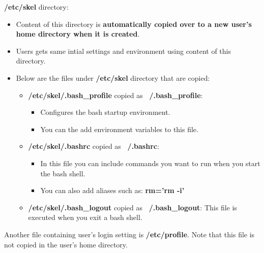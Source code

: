 \setlength{\columnsep}{3pt}
\begin{flushleft}

\textbf{/etc/skel} directory:
\begin{itemize}
	\item Content of this directory is \textbf{automatically copied over to a new user's home directory when it is created}.
	\item Users gets same intial settings and environment using content of this directory.
	\item Below are the files under \textbf{/etc/skel} directory that are copied:
	\begin{itemize}
		\item \textbf{/etc/skel/.bash\_profile} copied as \textbf{~/.bash\_profile}: 
		\begin{itemize}
			\item Configures the bash startup environment.
			\item You can the add environment variables to this file.
		\end{itemize}
		\bigskip
		\item \textbf{/etc/skel/.bashrc} copied as \textbf{~/.bashrc}: 
		\begin{itemize}
			\item In this file you can include commands you want to run when you start the bash shell.
			\item You can also add aliases such as: \textbf{rm='rm -i'}
		\end{itemize}
		\bigskip
		\item \textbf{/etc/skel/.bash\_logout} copied as \textbf{~/.bash\_logout}: 
		\newline
		This file is executed when you exit a bash shell.
	\end{itemize}	
	\bigskip
	
\end{itemize}

Another file containing user's login setting is \textbf{/etc/profile}. Note that this file is not copied in the user's home directory.





	
\end{flushleft}

\newpage

